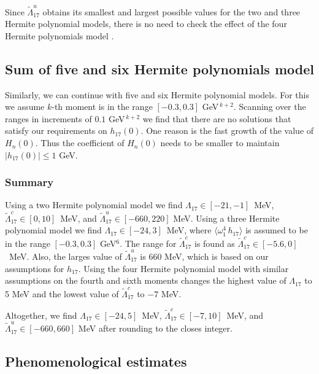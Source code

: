 Since $\tilde\Lambda_{17}^u$ obtains its smallest and largest possible values for the two and three Hermite polynomial models, there is no need to check the effect of the four Hermite polynomials model \cite{Gunawardana:2019gep}.

\subsection{Sum of five and six Hermite polynomials model} 

Similarly, we can continue with five and six Hermite polynomial models. For this we assume $k$-th moment is in the range $[-0.3,0.3]$ GeV$^{\,k+2}$. Scanning over the ranges in increments of $0.1$ GeV$^{\,k+2}$ we find that there are no solutions that satisfy our requirements on $h_{17}(0)$. One reason is the fast growth of the value of $H_n(0)$. Thus the coefficient of $H_n(0)$ needs to be smaller to maintain $|h_{17}(0)|\leq 1$ GeV.

\subsubsection{Summary}\label{subsec:summary} 
\vspace{-0.3cm}
Using a two Hermite polynomial model we find $\Lambda_{17}\in[-21,-1]$~MeV, $\tilde\Lambda_{17}^c\in[0,10]$~MeV, and $\tilde\Lambda_{17}^u\in[-660,220]$ MeV. Using a three Hermite polynomial model we find $\Lambda_{17}\in[-24,3]$~MeV, where $\langle\omega_1^4\,h_{17}\rangle$ is assumed to be in the range $[-0.3,0.3]$ GeV$^6$. The range for $\tilde\Lambda_{17}^c$ is found as $ \tilde\Lambda_{17}^c\in[-5.6,0]$~MeV. Also, the larges value of $\tilde\Lambda_{17}^u$ is $660$ MeV, which is based on our assumptions for $h_{17}$. Using the four Hermite polynomial model with similar assumptions on the fourth and sixth moments changes the highest value of $\Lambda_{17}$ to 5 MeV and the lowest value of $\tilde\Lambda_{17}^c$ to $-7$ MeV.\par
Altogether, we find $\Lambda_{17}\in[-24,5]$~MeV, $\tilde\Lambda_{17}^c\in[-7,10]$~MeV, and $\tilde\Lambda_{17}^u\in[-660,660]$ MeV after rounding to the closes integer.

\subsection{Phenomenological estimates}\label{subsec:pheno}

